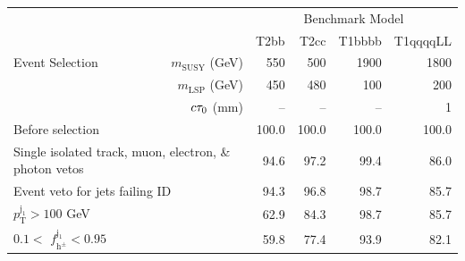 \clearpage
\begin{table}[p!]
    \begin{center}
        \begin{tabular}{lrrrrr}
      \hline
                                 \multirow{5}{*}{Event Selection} &                          &\multicolumn{4}{c}{Benchmark Model} \\\cline{3-6}
                                                                  &                          &  T2bb &  T2cc & T1bbbb & T1qqqqLL  \\
                                                                  & $m_{\textrm{SUSY}}$ (GeV)&   550 &   500 &   1900 &     1800  \\
                                                                  & $m_{\textrm{LSP}}$ (GeV) &   450 &   480 &   100  &     200   \\
                                                                  & $c\tau_{0}$ (mm)             &    -- &    -- &    --  &     1     \\
      \hline
\multicolumn{2}{l}{Before selection}                                                         & 100.0 & 100.0 &  100.0 &     100.0 \\
\multicolumn{2}{l}{Single isolated track, muon, electron, \& photon vetos}                   &  94.6 &  97.2 &   99.4 &      86.0 \\
\multicolumn{2}{l}{Event veto for jets failing ID}                                           &  94.3 &  96.8 &   98.7 &      85.7 \\
\multicolumn{2}{l}{$p_{\mathrm{T}}^\mathrm{j_1} > 100$ GeV}                                  &  62.9 &  84.3 &   98.7 &      85.7 \\
\multicolumn{2}{l}{$0.1 <$ $f^{\mathrm{j_1}}_{\mathrm{h}^\pm} < 0.95$}                       &  59.8 &  77.4 &   93.9 &      82.1 \\

\end{tabular}
\end{center}
\end{table}
